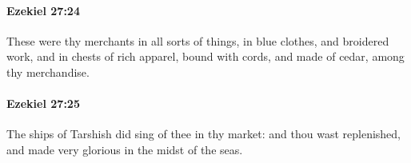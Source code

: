 		\paragraph{Ezekiel 27:24} %
			\label{EZEKIEL-27-24}

			These were thy merchants in all sorts of things, in blue clothes, and broidered work, and in chests of rich apparel, bound with cords, and made of cedar, among thy merchandise.


		\paragraph{Ezekiel 27:25} %
			\label{EZEKIEL-27-25}

			The ships of Tarshish did sing of thee in thy market: and thou wast replenished, and made very glorious in the midst of the seas.


